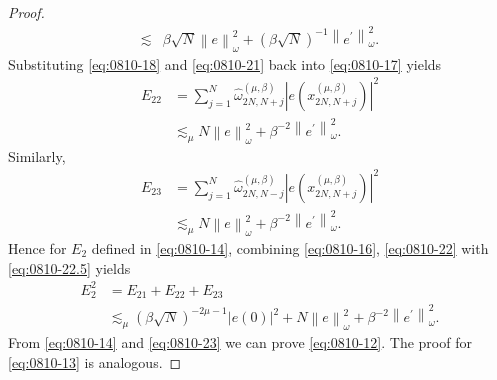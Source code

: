 \documentclass[pdflatex,sn-aps]{sn-jnl}%
\theoremstyle{thmstyleone}%
\theoremstyle{thmstyletwo}%
\theoremstyle{thmstylethree}%
\begin{document}
\begin{appendices}
\begin{proof}
\begin{equation}
\begin{aligned}
      \lesssim & \beta \sqrt{N} \left\|e\right\|_\omega^2 + \left(\beta\sqrt{N}\right)^{-1} \left\|e^{\prime}\right\|_\omega^2.
    \end{aligned}
  \end{equation}
  Substituting \eqref{eq:0810-18} and \eqref{eq:0810-21} back into
  \eqref{eq:0810-17} yields
  \begin{equation}\label{eq:0810-22}
    \begin{aligned}
      E_{22} & = \sum_{j=1}^N \widehat{\omega}_{2 N, N+j}^{(\mu, \beta)}\left|e\left(x_{2N,N+j}^{(\mu,\beta)}\right)\right|^2 \\
      & \lesssim_\mu N \left\|e\right\|_\omega^2 + \beta^{-2} \left\|e^{\prime}\right\|_\omega^2.
    \end{aligned}
  \end{equation}
  Similarly,
  \begin{equation}\label{eq:0810-22.5}
    \begin{aligned}
      E_{23} & = \sum_{j=1}^N \widehat{\omega}_{2 N, N-j}^{(\mu, \beta)}\left|e\left(x_{2N,N+j}^{(\mu,\beta)}\right)\right|^2 \\
      & \lesssim_\mu N \left\|e\right\|_\omega^2 + \beta^{-2} \left\|e^{\prime}\right\|_\omega^2.
    \end{aligned}
  \end{equation}
  Hence for $E_2$ defined in \eqref{eq:0810-14}, combining
  \eqref{eq:0810-16}, \eqref{eq:0810-22} with \eqref{eq:0810-22.5}
  yields
  \begin{equation}\label{eq:0810-23}
    \begin{aligned}
      E_2^2 &= E_{21} + E_{22} + E_{23} \\
      & \lesssim_\mu (\beta \sqrt{N})^{-2 \mu-1}|e(0)|^2 + N \left\|e\right\|_\omega^2 + \beta^{-2} \left\|e^{\prime}\right\|_\omega^2.
    \end{aligned}
  \end{equation}
  From \eqref{eq:0810-14} and \eqref{eq:0810-23} we can prove
  \eqref{eq:0810-12}. The proof for
  \eqref{eq:0810-13} is analogous.
\end{proof}


\end{appendices}
\end{document}
